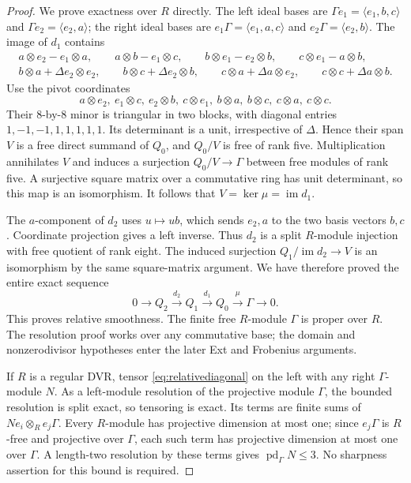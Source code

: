 \documentclass[11pt,a4paper]{article}
\theoremstyle{named}\newtheorem{finding}{Finding}[section]
\theoremstyle{definition}\newtheorem{definition}[finding]{Definition}
\theoremstyle{remark}\newtheorem{remark}[finding]{Remark}
\begin{document}
\begin{proof}
We prove exactness over $R$ directly. The left ideal bases are
$\Gamma e_1=\langle e_1,b,c\rangle$ and
$\Gamma e_2=\langle e_2,a\rangle$; the right ideal bases are
$e_1\Gamma=\langle e_1,a,c\rangle$ and
$e_2\Gamma=\langle e_2,b\rangle$.
The image of $d_1$ contains
\[
 \begin{gathered}
 a\otimes e_2-e_1\otimes a,\qquad
 a\otimes b-e_1\otimes c,\qquad
 b\otimes e_1-e_2\otimes b,\qquad
 c\otimes e_1-a\otimes b,\\
 b\otimes a+\Delta e_2\otimes e_2,\qquad
 b\otimes c+\Delta e_2\otimes b,\qquad
 c\otimes a+\Delta a\otimes e_2,\qquad
 c\otimes c+\Delta a\otimes b.
 \end{gathered}
\]
Use the pivot coordinates
\[
 a\otimes e_2,\ e_1\otimes c,\ e_2\otimes b,\ c\otimes e_1,\
 b\otimes a,\ b\otimes c,\ c\otimes a,\ c\otimes c.
\]
Their $8$-by-$8$ minor is triangular in two blocks, with
diagonal entries $1,-1,-1,1,1,1,1,1$. Its determinant is
a unit, irrespective of $\Delta$. Hence their span $V$
is a free direct summand of $Q_0$, and $Q_0/V$ is free of
rank five. Multiplication annihilates $V$ and induces a
surjection $Q_0/V\to\Gamma$ between free modules of rank
five. A surjective square matrix over a commutative ring
has unit determinant, so this map is an isomorphism.
It follows that $V=\ker\mu=\operatorname{im}d_1$.

The $a$-component of $d_2$ uses $u\mapsto ub$, which sends
$e_2,a$ to the two basis vectors $b,c$. Coordinate projection
gives a left inverse. Thus $d_2$ is a split $R$-module
injection with free quotient of rank eight. The induced
surjection $Q_1/\operatorname{im}d_2\to V$ is an
isomorphism by the same square-matrix argument. We have
therefore proved the entire exact sequence
\begin{equation}\label{eq:relativediagonal}
 0\longrightarrow Q_2\xrightarrow{d_2}Q_1
   \xrightarrow{d_1}Q_0\xrightarrow{\mu}\Gamma
   \longrightarrow0.
\end{equation}
This proves relative smoothness. The finite free
$R$-module $\Gamma$ is proper over $R$.
The resolution proof works over any commutative base;
the domain and nonzerodivisor hypotheses enter the later
Ext and Frobenius arguments.

If $R$ is a regular DVR, tensor
\eqref{eq:relativediagonal} on the left with any right
$\Gamma$-module $N$. As a left-module resolution of the
projective module $\Gamma$, the bounded resolution is split
exact, so tensoring is exact. Its terms are finite sums of
$Ne_i\otimes_R e_j\Gamma$. Every $R$-module has projective
dimension at most one; since $e_j\Gamma$ is $R$-free and
projective over $\Gamma$, each such term has projective
dimension at most one over $\Gamma$. A length-two resolution
by these terms gives $\operatorname{pd}_\Gamma N\le3$.
No sharpness assertion for this bound is required.


\end{proof}
\end{document}
